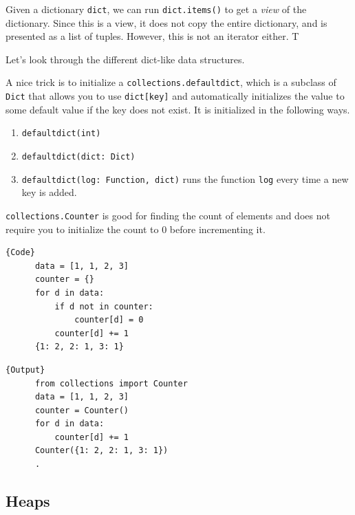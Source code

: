   \begin{definition}[Items]
    \label{def:items}
    Given a dictionary \texttt{dict}, we can run \texttt{dict.items()} to get a \textit{view} of the dictionary. Since this is a view, it does not copy the entire dictionary, and is presented as a list of tuples. However, this is not an iterator either. T 
  \end{definition}


  Let's look through the different dict-like data structures. 

  \begin{definition}[Defaultdict]
    \label{def:defaultdict}
    A nice trick is to initialize a \texttt{collections.defaultdict}, which is a subclass of \texttt{Dict} that allows you to use \texttt{dict[key]} and automatically initializes the value to some default value if the key does not exist. It is initialized in the following ways. 
    \begin{enumerate}
      \item \texttt{defaultdict(int)} 
      \item \texttt{defaultdict(dict: Dict)} 
      \item \texttt{defaultdict(log: Function, dict)} runs the function \texttt{log} every time a new key is added. 
    \end{enumerate}
  \end{definition}

  \begin{definition}[Counter]
    \label{def:counter}
    \texttt{collections.Counter} is good for finding the count of elements and does not require you to initialize the count to $0$ before incrementing it. 

    \noindent\begin{minipage}{.5\textwidth}
    \begin{lstlisting}[]{Code}
      data = [1, 1, 2, 3] 
      counter = {} 
      for d in data: 
          if d not in counter: 
              counter[d] = 0 
          counter[d] += 1
      {1: 2, 2: 1, 3: 1}
    \end{lstlisting}
    \end{minipage}
    \hfill
    \begin{minipage}{.49\textwidth}
    \begin{lstlisting}[]{Output}
      from collections import Counter
      data = [1, 1, 2, 3] 
      counter = Counter() 
      for d in data: 
          counter[d] += 1 
      Counter({1: 2, 2: 1, 3: 1})
      .
    \end{lstlisting}
    \end{minipage}
  \end{definition}

\subsection{Heaps}

